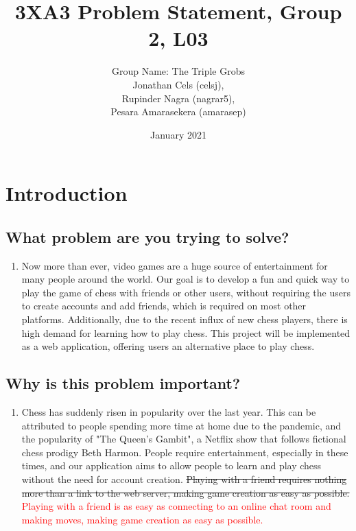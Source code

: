 \documentclass{article}
\title{3XA3 Problem Statement, Group 2, L03}
\author{Group Name: The Triple Grobs \\ Jonathan Cels (celsj), \\Rupinder Nagra (nagrar5), \\Pesara Amarasekera (amarasep)}
\date{January 2021}
\begin{document}
\maketitle
\section{Introduction}
\subsection{What problem are you trying to solve?}
\begin{enumerate}[label={}]
    \item Now more than ever, video games are a huge source of entertainment for many people around the world. Our goal is to develop a fun and quick way to play the game of chess with friends or other users, without requiring the users to create accounts and add friends, which is required on most other platforms. Additionally, due to the recent influx of new chess players, there is high demand for learning how to play chess. This project will be implemented as a web application, offering users an alternative place to play chess.
\end{enumerate}

\subsection{Why is this problem important?}
\begin{enumerate}[label={}]
    \item Chess has suddenly risen in popularity over the last year. This can be attributed to people spending more time at home due to the pandemic, and the popularity of "The Queen's Gambit", a Netflix show that follows fictional chess prodigy Beth Harmon. People require entertainment, especially in these times, and our application aims to allow people to learn and play chess without the need for account creation. \sout{Playing with a friend requires nothing more than a link to the web server, making game creation as easy as possible.} \textcolor{red}{Playing with a friend is as easy as connecting to an online chat room and making moves, making game creation as easy as possible.}
\end{enumerate}
\end{document}
